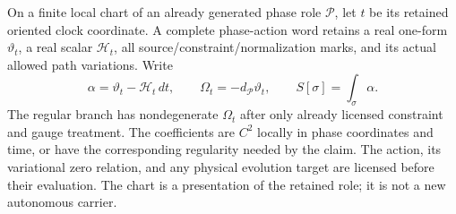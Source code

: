 \documentclass[12pt,a4paper]{article}
\begin{document}
\begin{definition}
\label{p2a:def:v2190-clocked-phase-word}
On a finite local chart of an already generated phase role \(\mathcal P\),
let \(t\) be its retained oriented clock coordinate.  A complete phase-action
word retains a real one-form \(\vartheta_t\), a real scalar \(\mathcal H_t\),
all source/constraint/normalization marks, and its actual allowed path
variations.  Write
\[
 \alpha=\vartheta_t-\mathcal H_t\,dt,\qquad
 \Omega_t=-d_{\mathcal P}\vartheta_t,
 \qquad S[\sigma]=\int_\sigma\alpha.
\]
The regular branch has nondegenerate \(\Omega_t\) after only already licensed
constraint and gauge treatment.  The coefficients are \(C^2\) locally in
phase coordinates and time, or have the corresponding regularity needed by
the claim.  The action, its variational zero relation, and any physical
evolution target are licensed before their evaluation.  The chart is a
presentation of the retained role; it is not a new autonomous carrier.
\end{definition}
\end{document}
